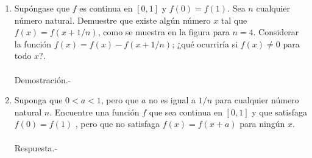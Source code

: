 \begin{enumerate}
\begin{enumerate}[\bfseries a)]
	\item Supóngase que $f$ es continua en $[0,1]$ y $f(0)=f(1)$. Sea $n$ cualquier número natural. Demuestre que existe algún número $x$ tal que $f(x)=f(x+1/n)$, como se muestra en la figura para $n=4$. Considerar la función $f(x)=f(x)-f(x+1/n)$; ¿qué ocurriría si $f(x)\neq 0$ para todo $x$?.\\\\
	    Demostración.-\; 

	\item Suponga que $0<a<1$, pero que $a$ no es igual a $1/n$ para cualquier número natural $n$. Encuentre una función $f$ que sea continua en $[0,1]$ y que satisfaga $f(0)=f(1)$ , pero que no satisfaga $f(x)=f(x+a)$ para ningún $x$.\\\\
	    Respuesta.-\; 

    \end{enumerate}
    

\end{enumerate}
